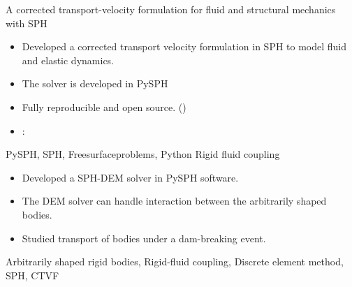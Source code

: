 %
%



\begin{experiences}


  \experience
    {}   {A corrected transport-velocity formulation for fluid and structural mechanics with SPH}{}{}
    {} {
                      \begin{itemize}
                      \item Developed a corrected transport velocity formulation in SPH to model
                        fluid and elastic dynamics.
                      \item The solver is developed in PySPH %
                      \item Fully reproducible and open source. ()
                      \item \faGithub: 
                      \end{itemize}
                    }
                    {PySPH, SPH, Freesurfaceproblems, Python}
  \emptySeparator
  \experience
  {} {Rigid fluid coupling}{}{}
  {}    {
                    \begin{itemize}
                    \item Developed a SPH-DEM solver in PySPH software.
                    \item The DEM solver can handle interaction between the arbitrarily shaped bodies.
                    \item Studied transport of bodies under a dam-breaking event.
                    \end{itemize}
                  }
                  {Arbitrarily shaped rigid bodies, Rigid-fluid coupling, Discrete element method, SPH, CTVF}


\end{experiences}
